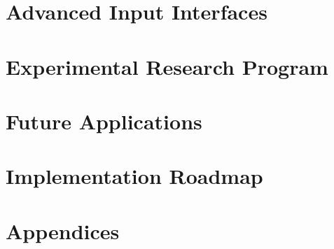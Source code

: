\documentclass[11pt,twoside,openany]{book}
\theoremstyle{definition}
\theoremstyle{plain}
\theoremstyle{remark}
\begin{document}
\part{Advanced Input Interfaces}\label{part:advanced}


\part{Experimental Research Program}\label{part:research}


\part{Future Applications}\label{part:future}


\part{Implementation Roadmap}\label{part:roadmap}


\appendix
\part{Appendices}


\backmatter

\end{document}
